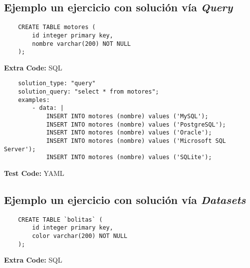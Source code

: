 
\subsection*{Ejemplo un ejercicio con solución vía \textit{Query}}


\begin{listing}[ht]
    \begin{verbatim}
    CREATE TABLE motores (
        id integer primary key,
        nombre varchar(200) NOT NULL
    );
    \end{verbatim}
    \caption{\textbf{Extra Code:} SQL}
    \label{listing:yaml}
\end{listing}

\begin{listing}[ht]
    \begin{verbatim}
    solution_type: "query"
    solution_query: "select * from motores";
    examples:
        - data: |
            INSERT INTO motores (nombre) values ('MySQL');
            INSERT INTO motores (nombre) values ('PostgreSQL');
            INSERT INTO motores (nombre) values ('Oracle');
            INSERT INTO motores (nombre) values ('Microsoft SQL Server');
            INSERT INTO motores (nombre) values ('SQLite');
    \end{verbatim}
    \caption{\textbf{Test Code:} YAML}
    \label{listing:yaml}
\end{listing}


\subsection*{Ejemplo un ejercicio con solución vía \textit{Datasets}}


\begin{listing}[ht]
    \begin{verbatim}
    CREATE TABLE `bolitas` (
        id integer primary key,
        color varchar(200) NOT NULL
    );
    \end{verbatim}
    \caption{\textbf{Extra Code:} SQL}
    \label{listing:yaml}
\end{listing}

